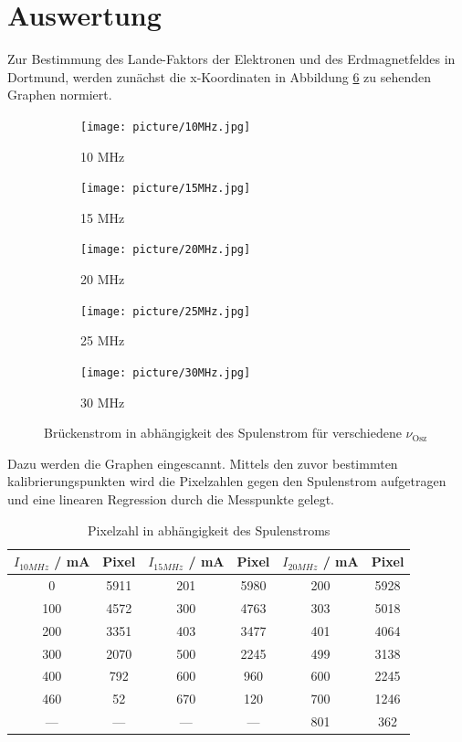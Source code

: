 \section{Auswertung}
\label{sec:Auswertung}
Zur Bestimmung des Lande-Faktors der Elektronen und des Erdmagnetfeldes in Dortmund, werden zunächst die x-Koordinaten in Abbildung \ref{fig:Skizze} zu sehenden Graphen normiert.
\begin{figure}
  \centering
  \begin{subfigure}[b]{0.49\textwidth}
     \texttt{[image: picture/10MHz.jpg]}
     \caption{10 MHz}
     \label{fig:10Skiz}
  \end{subfigure}
  \begin{subfigure}[b]{0.49\textwidth}
     \texttt{[image: picture/15MHz.jpg]}
     \caption{15 MHz}
     \label{fig:15Skiz}
  \end{subfigure}
  \begin{subfigure}[b]{0.49\textwidth}
     \texttt{[image: picture/20MHz.jpg]}
     \caption{20 MHz}
     \label{fig:20Skiz}
  \end{subfigure}
  \begin{subfigure}[b]{0.49\textwidth}
     \texttt{[image: picture/25MHz.jpg]}
     \caption{25 MHz}
     \label{fig:25Skiz}
  \end{subfigure}
  \begin{subfigure}[b]{0.49\textwidth}
     \texttt{[image: picture/30MHz.jpg]}
     \caption{30 MHz}
     \label{fig:30Skiz}
  \end{subfigure}
  \caption{Brückenstrom in abhängigkeit des Spulenstrom für verschiedene $\nu_\text{Osz}$}
  \label{fig:Skizze}
\end{figure}
Dazu werden die Graphen eingescannt. Mittels den zuvor bestimmten kalibrierungspunkten wird die Pixelzahlen gegen den Spulenstrom aufgetragen und eine linearen Regression durch die Messpunkte gelegt.  
\begin{table}
  \centering
  \caption{Pixelzahl in abhängigkeit des Spulenstroms}
  \begin{tabular}{c c|c c|c c}
    \toprule
    	$I_{10 MHz}$ / mA & Pixel & $I_{15MHz}$ / mA & Pixel & $I_{20MHz}$ / mA & Pixel \\    
    \midrule
	0   & 5911 & 201 & 5980 & 200 & 5928 \\
	100 & 4572 & 300 & 4763 & 303 & 5018 \\
	200 & 3351 & 403 & 3477 & 401 & 4064 \\
	300 & 2070 & 500 & 2245 & 499 & 3138 \\
	400 & 792  & 600 & 960  & 600 & 2245 \\
	460 & 52   & 670 & 120  & 700 & 1246 \\
	--- & ---  & --- & ---  & 801 & 362  \\
    \bottomrule 
  \end{tabular}
  \label{tab:Mess}
\end{table}
